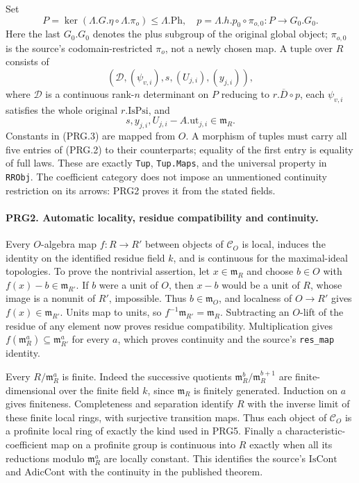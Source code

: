 Set
\[
 P=\ker(\Lambda.G.\eta\circ\Lambda.\pi_o)\le\Lambda.\mathrm{Ph},
 \quad p=\Lambda.h.p_0\circ\pi_{o,0}:P\longrightarrow G_0.G_0.
 \tag{PRG.1}
\]
Here the last \(G_0.G_0\) denotes the plus subgroup of the original
global object; \(\pi_{o,0}\) is the source's codomain-restricted
\(\pi_o\), not a newly chosen map. A tuple over \(R\) consists of
\[
 (\mathcal D,(\psi_{v,i}),s,(U_{j,i}),(y_{j,i})),                 \tag{PRG.2}
\]
where \(\mathcal D\) is a continuous rank-\(n\) determinant on
\(P\) reducing to \(r.\overline D\circ p\), each \(\psi_{v,i}\)
satisfies the whole original \(r.\mathrm{IsPsi}\), and
\[
 s,y_{j,i},U_{j,i}-A.\mathrm{ut}_{j,i}\in\mathfrak m_R.
 \tag{PRG.3}
\]
Constants in (PRG.3) are mapped from \(O\). A morphism of tuples
must carry all five entries of (PRG.2) to their counterparts; equality
of the first entry is equality of full laws. These are exactly
\texttt{Tup}, \texttt{Tup.Maps}, and the universal property in
\texttt{RRObj}. The coefficient category does not impose an
unmentioned continuity restriction on its arrows: PRG2 proves it
from the stated fields.

\paragraph{PRG2. Automatic locality, residue compatibility and continuity.}
\label{claim:PRG2}
Every \(O\)-algebra map \(f:R\to R'\) between objects of
\(\mathcal C_O\) is local, induces the identity on the identified
residue field \(k\), and is continuous for the maximal-ideal
topologies. To prove the nontrivial assertion, let
\(x\in\mathfrak m_R\) and choose \(b\in O\) with
\(f(x)-b\in\mathfrak m_{R'}\). If \(b\) were a unit of \(O\),
then \(x-b\) would be a unit of \(R\), whose image is a nonunit of
\(R'\), impossible. Thus \(b\in\mathfrak m_O\), and localness of
\(O\to R'\) gives \(f(x)\in\mathfrak m_{R'}\). Units map to
units, so \(f^{-1}\mathfrak m_{R'}=\mathfrak m_R\).
Subtracting an \(O\)-lift of the residue of any element now proves
residue compatibility. Multiplication gives
\(f(\mathfrak m_R^a)\subseteq\mathfrak m_{R'}^a\) for every \(a\),
which proves continuity and the source's \texttt{res\_map} identity.

Every \(R/\mathfrak m_R^a\) is finite. Indeed the successive quotients
\(\mathfrak m_R^b/\mathfrak m_R^{b+1}\) are finite-dimensional over
the finite field \(k\), since \(\mathfrak m_R\) is finitely
generated. Induction on \(a\) gives finiteness. Completeness and
separation identify \(R\) with the inverse limit of these finite
local rings, with surjective transition maps. Thus each object of
\(\mathcal C_O\) is a profinite local ring of exactly the kind used
in PRG5. Finally a characteristic-coefficient map on a profinite
group is continuous into \(R\) exactly when all its reductions
modulo \(\mathfrak m_R^a\) are locally constant. This identifies
the source's \(\mathrm{IsCont}\) and \(\mathrm{AdicCont}\) with
the continuity in the published theorem.

